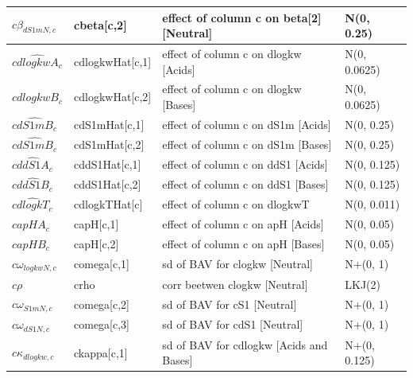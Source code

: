 \documentclass[
]{article}
\begin{document}
\begin{longtable}[t]{l|l|l|l}
\hline
\hspace{1em}$c\beta_{dS1mN,c}$ & cbeta[c,2] & effect of column c on beta[2] [Neutral] & N(0, 0.25)\\
\hline
\hspace{1em}$\widehat{cdlogkwA_{c}}$ & cdlogkwHat[c,1] & effect of column c on dlogkw [Acids] & N(0, 0.0625)\\
\hline
\hspace{1em}$\widehat{cdlogkwB_{c}}$ & cdlogkwHat[c,2] & effect of column c on dlogkw [Bases] & N(0, 0.0625)\\
\hline
\hspace{1em}$\widehat{cdS1mB_{c}}$ & cdS1mHat[c,1] & effect of column c on dS1m [Acids] & N(0, 0.25)\\
\hline
\hspace{1em}$\widehat{cdS1mB_{c}}$ & cdS1mHat[c,2] & effect of column c on dS1m [Bases] & N(0, 0.25)\\
\hline
\hspace{1em}$\widehat{cddS1A_{c}}$ & cddS1Hat[c,1] & effect of column c on ddS1 [Acids] & N(0, 0.125)\\
\hline
\hspace{1em}$\widehat{cddS1B_{c}}$ & cddS1Hat[c,2] & effect of column c on ddS1 [Bases] & N(0, 0.125)\\
\hline
\hspace{1em}$\widehat{cdlogkT_c}$ & cdlogkTHat[c] & effect of column c on dlogkwT & N(0, 0.011)\\
\hline
\hspace{1em}$capHA_{c}$ & capH[c,1] & effect of column c on apH [Acids] & N(0, 0.05)\\
\hline
\hspace{1em}$capHB_{c}$ & capH[c,2] & effect of column c on apH [Bases] & N(0, 0.05)\\
\hline
\hspace{1em}$c\omega_{logkwN,c}$ & comega[c,1] & sd of BAV for clogkw [Neutral] & N+(0, 1)\\
\hline
\hspace{1em}$c\rho$ & crho & corr beetwen clogkw [Neutral] & LKJ(2)\\
\hline
\hspace{1em}$c\omega_{S1mN,c}$ & comega[c,2] & sd of BAV for cS1 [Neutral] & N+(0, 1)\\
\hline
\hspace{1em}$c\omega_{dS1N,c}$ & comega[c,3] & sd of BAV for cdS1 [Neutral] & N+(0, 1)\\
\hline
\hspace{1em}$c\kappa_{dlogkw,c}$ & ckappa[c,1] & sd of BAV for cdlogkw [Acids and Bases] & N+(0, 0.125)\\

\end{longtable}
\end{document}
